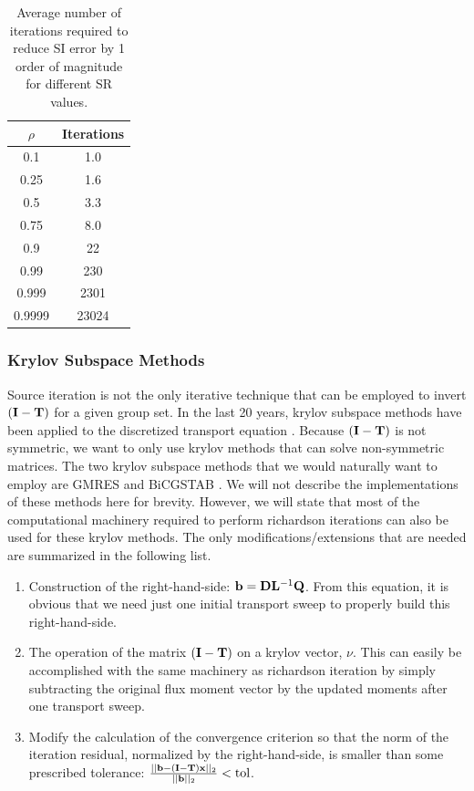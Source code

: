 \begin{table}
\caption{Average number of iterations required to reduce SI error by 1 order of magnitude for different SR values.}
\begin{center}
\begin{tabular}{|c|c|}
\hline
$\rho$ & Iterations \\ \hline \hline
0.1 & 1.0 \\ 
0.25 & 1.6 \\ 
0.5 & 3.3 \\  
0.75 & 8.0 \\ 
0.9 & 22 \\ 
0.99 & 230 \\ 
0.999 & 2301 \\ 
0.9999 & 23024 \\
\hline
\end{tabular}
\end{center}
\label{tab::Sn_convergece_rates}
\end{table}

\subsubsection{Krylov Subspace Methods}
\label{sec::Sn_Solution_Iterative_GMRES}

Source iteration is not the only iterative technique that can be employed to invert $({\bf I} - {\bf T})$ for a given group set. In the last 20 years, krylov subspace methods have been applied to the discretized transport equation \cite{oliveira1998preconditioned,guthrie1999gmres,patton2002application}. Because $({\bf I} - {\bf T})$ is not symmetric, we want to only use krylov methods that can solve non-symmetric matrices. The two krylov subspace methods that we would naturally want to employ are GMRES and BiCGSTAB \cite{saad1986gmres,saad2003iterative}. We will not describe the implementations of these methods here for brevity. However, we will state that most of the computational machinery required to perform richardson iterations can also be used for these krylov methods. The only modifications/extensions that are needed are summarized in the following list.

\begin{enumerate}
\item Construction of the right-hand-side: ${\bf b} = {\bf D} {\bf L}^{-1} {\bf Q}$. From this equation, it is obvious that we need just one initial transport sweep to properly build this right-hand-side.
\item The operation of the matrix $({\bf I} - {\bf T})$ on a krylov vector, $\nu$. This can easily be accomplished with the same machinery as richardson iteration by simply subtracting the original flux moment vector by the updated moments after one transport sweep.
\item Modify the calculation of the convergence criterion so that the norm of the iteration residual, normalized by the right-hand-side, is smaller than some prescribed tolerance:
$\frac{||{\bf b} - ({\bf I} - {\bf T}) {\bf x} ||_2}{||{\bf b}||_2} < \text{tol}$.
\end{enumerate}

